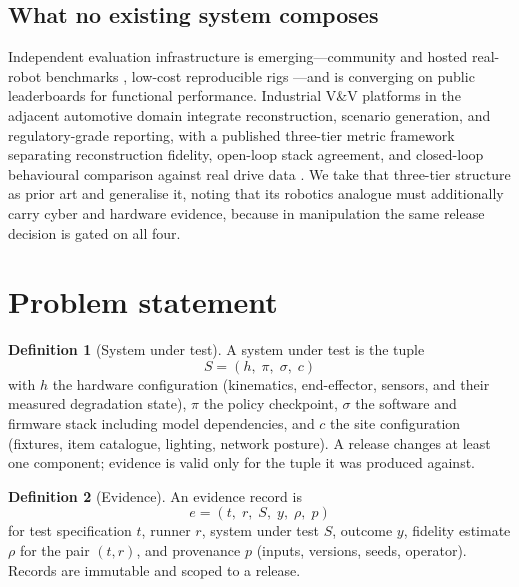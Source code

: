 \documentclass[11pt]{article}
\theoremstyle{definition}
\newtheorem{definition}{Definition}
\newcommand{\sut}{\ensuremath{S}}
\begin{document}
\subsection{What no existing system composes}

Independent evaluation infrastructure is emerging---community and hosted real-robot
benchmarks \citep{roboarena,robochallenge}, low-cost reproducible rigs \citep{phail,replica}---and
is converging on public leaderboards for functional performance. Industrial V\&V platforms in
the adjacent automotive domain integrate reconstruction, scenario generation, and
regulatory-grade reporting, with a published three-tier metric framework separating
reconstruction fidelity, open-loop stack agreement, and closed-loop behavioural comparison
against real drive data \citep{neuralsim,wfm}. We take that three-tier structure as prior art
and generalise it, noting that its robotics analogue must additionally carry cyber and
hardware evidence, because in manipulation the same release decision is gated on all four.

\section{Problem statement}
\label{sec:problem}

\begin{definition}[System under test]
A system under test is the tuple
\begin{equation}
  \sut = (h,\; \pi,\; \sigma,\; c)
\end{equation}
with $h$ the hardware configuration (kinematics, end-effector, sensors, and their measured
degradation state), $\pi$ the policy checkpoint, $\sigma$ the software and firmware stack
including model dependencies, and $c$ the site configuration (fixtures, item catalogue,
lighting, network posture). A release changes at least one component; evidence is valid only
for the tuple it was produced against.
\end{definition}

\begin{definition}[Evidence]
An evidence record is
\begin{equation}
  e = (t,\; r,\; \sut,\; y,\; \rho,\; p)
\end{equation}
for test specification $t$, runner $r$, system under test $\sut$, outcome $y$, fidelity
estimate $\rho$ for the pair $(t,r)$, and provenance $p$ (inputs, versions, seeds,
operator). Records are immutable and scoped to a release.
\end{definition}
\end{document}
